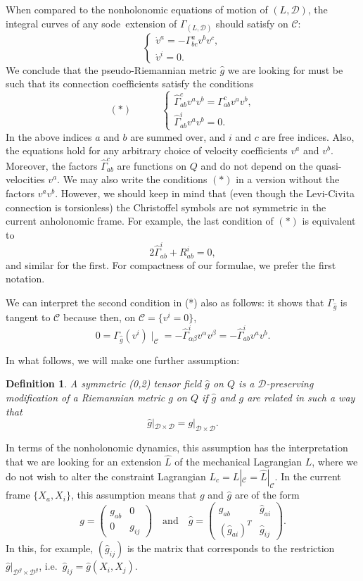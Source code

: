 \documentclass[11pt]{article}
\newtheorem{defi}{Definition}
\def\sode{{\sc sode}}
\def\D{{\mathcal D}}
\def\C{{\mathcal C}}
\def\GLD{{\Gamma_{(L,\mathcal{D})}}}
\begin{document}
When compared to the nonholonomic equations of motion of $(L,\D)$, the integral curves of any \sode\ extension of $\GLD$ should satisfy on $\C$:
$$
\left\{\begin{array}{l}\dot{v}^a=-\Gamma_{b c}^a v^b v^c, \\ \dot{v}^i=0.\end{array}\right.
$$ 
We conclude that the pseudo-Riemannian metric $\hat{g}$ we are looking for  must be such that its connection coefficients satisfy the  conditions 
$$
(*)\qquad\quad \left\{\begin{array}{l}\hat{\Gamma}_{ab}^c v^a v^b =\Gamma_{a b}^c v^a v^b,\\
\hat{\Gamma}_{ab}^i v^a v^b=0.\end{array}\right.
$$
{In the above indices $a$ and $b$ are summed over, and $i$ and $c$ are free indices. Also, the equations hold for any arbitrary choice of velocity coefficients $v^a$ and $v^b$.} Moreover, the factors $\hat{\Gamma}_{ab}^c$ are functions on $Q$ and do not depend on the quasi-velocities $v^a$. We may also write the  conditions $(*)$ in a version without the factors $v^a v^b$. However, we should keep  in mind  that (even though the Levi-Civita connection  is torsionless) the Christoffel symbols are not symmetric in the current anholonomic frame. For example, the last condition of $(*)$ is equivalent {to}
 \[
2\hat{\Gamma}_{ab}^i + R_{ab}^i= 0,
\]
and similar for the first. For compactness of our formulae, we prefer the first notation.



We can interpret the second condition in (*) also as follows: it shows that  $\Gamma_{\hat g}$ is  tangent to ${\mathcal C}$ because  then, on ${\mathcal C}=\{v^i=0\}$, \[
0=\Gamma_{\hat g}(v^i) \mid_{\mathcal C}= -{\hat\Gamma}^i_{\alpha\beta}v^\alpha v^\beta = - {\hat \Gamma}^i_{ab}v^a v^b.
\]  


In what follows, we will make one further assumption: 
\begin{defi} A symmetric (0,2) tensor field $\hat g$ on $Q$ is a $\D$-preserving modification of a Riemannian metric $g$ on $Q$ if $\hat g$ and $g$ are related in such a way that
\[
{\hat g}|_{\D \times \D} = g|_{\D \times \D}.
\]
\end{defi}
In terms of the nonholonomic dynamics, this assumption has the interpretation that we are looking for an extension $\hat L$ of the mechanical Lagrangian $L$, where we do not wish to alter the constraint Lagrangian $L_c=L|_\C={\hat L}|_\C$.
In the current frame $\{X_a,X_i\}$, this assumption means that $g$ and $\hat g$ are of the form
$$
{g}=\left(\begin{array}{cc}
g_{a b} & 0 \\
0 & {g}_{i j}
\end{array}\right)
\quad \mbox{and}\quad
\hat{g}=\left(\begin{array}{cc}
g_{a b} & \hat{g}_{a i} \\ {(\hat{g}_{ai})^T} & \hat{g}_{i j}
\end{array}\right).
$$
In this, for example, $({\hat g}_{ij})$ is the matrix that corresponds to the restriction ${\hat g}|_{\D^g \times \D^g}$, i.e.\ ${\hat g}_{ij} = {\hat g}(X_i,X_j)$.
\end{document}
